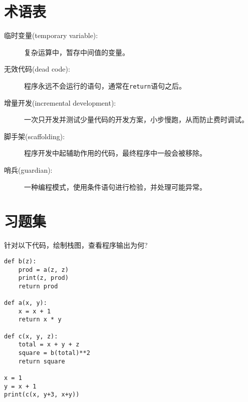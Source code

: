 \documentclass[10pt]{book}
\begin{document}
\section{术语表}

\begin{description}

\item[临时变量(temporary variable):]  复杂运算中，暂存中间值的变量。

\item[无效代码(dead code):]  程序永远不会运行的语句，通常在{\tt return}语句之后。

\item[增量开发(incremental development):]  一次只开发并测试少量代码的开发方案，小步慢跑，从而防止费时调试。

\item[脚手架(scaffolding):]  程序开发中起辅助作用的代码，最终程序中一般会被移除。

\item[哨兵(guardian):]  一种编程模式，使用条件语句进行检验，并处理可能异常。

\end{description}


\section{习题集}

\begin{exercise}
针对以下代码，绘制栈图，查看程序输出为何?

\begin{verbatim}
def b(z):
    prod = a(z, z)
    print(z, prod)
    return prod

def a(x, y):
    x = x + 1
    return x * y

def c(x, y, z):
    total = x + y + z
    square = b(total)**2
    return square

x = 1
y = x + 1
print(c(x, y+3, x+y))
\end{verbatim}

\end{exercise}
\end{document}
